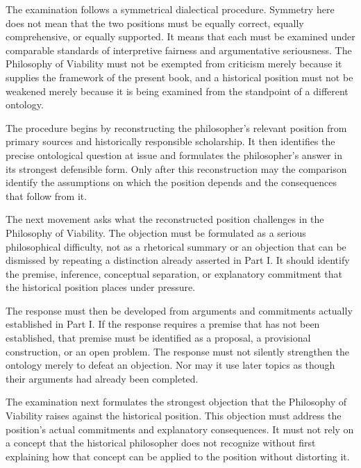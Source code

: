 \label{para:VS.B01.P01.C08.S01.SS04.P001}
The examination follows a symmetrical dialectical procedure.
Symmetry here does not mean that the two positions must be
equally correct, equally comprehensive, or equally supported.
It means that each must be examined under comparable
standards of interpretive fairness and argumentative
seriousness. The Philosophy of Viability must not be exempted
from criticism merely because it supplies the framework of
the present book, and a historical position must not be
weakened merely because it is being examined from the
standpoint of a different ontology.

\label{para:VS.B01.P01.C08.S01.SS04.P002}
The procedure begins by reconstructing the philosopher's
relevant position from primary sources and historically
responsible scholarship. It then identifies the precise
ontological question at issue and formulates the philosopher's
answer in its strongest defensible form. Only after this
reconstruction may the comparison identify the assumptions
on which the position depends and the consequences that
follow from it.

\label{para:VS.B01.P01.C08.S01.SS04.P003}
The next movement asks what the reconstructed position
challenges in the Philosophy of Viability. The objection
must be formulated as a serious philosophical difficulty,
not as a rhetorical summary or an objection that can be
dismissed by repeating a distinction already asserted in
Part I. It should identify the premise, inference, conceptual
separation, or explanatory commitment that the historical
position places under pressure.

\label{para:VS.B01.P01.C08.S01.SS04.P004}
The response must then be developed from arguments and
commitments actually established in Part I. If the response
requires a premise that has not been established, that
premise must be identified as a proposal, a provisional
construction, or an open problem. The response must not
silently strengthen the ontology merely to defeat an
objection. Nor may it use later topics as though their
arguments had already been completed.

\label{para:VS.B01.P01.C08.S01.SS04.P005}
The examination next formulates the strongest objection
that the Philosophy of Viability raises against the
historical position. This objection must address the
position's actual commitments and explanatory consequences.
It must not rely on a concept that the historical philosopher
does not recognize without first explaining how that concept
can be applied to the position without distorting it.

